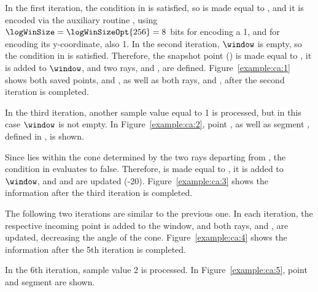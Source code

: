 In the first iteration, the condition in  is satisfied, so \archived is made equal to , and it is encoded via the auxiliary routine \CAWinStart, using $\logWinSize = \logWinSizeOpt{256}=8$ bits for encoding a 1, and \tobitexp for encoding its y-coordinate, also 1. In the second iteration, $\window$ is empty, so the condition in  is satisfied. Therefore, the snapshot point (\snapshot) is made equal to , it is added to $\window$, and two rays, \smin and \smax, are defined. Figure~\ref{example:ca:1} shows both saved points, \archived and \snapshot, as well as both rays, \smin and \smax, after the second iteration is completed.


\vspace{+3pt}


In the third iteration, another sample value equal to 1 is processed, but in this case $\window$ is not empty. In Figure~\ref{example:ca:2}, point , as well as segment , defined in , is shown.


\vspace{+3pt}


\clearpage


Since  lies within the cone determined by the two rays departing from \archived, the condition in  evaluates to false. Therefore, \snapshot is made equal to , it is added to $\window$, and \smin and \smax are updated (-20). Figure~\ref{example:ca:3} shows the information after the third iteration is completed.


\vspace{+5pt}


The following two iterations are similar to the previous one. In each iteration, the respective incoming point is added to the window, and both rays, \smin and \smax, are updated, decreasing the angle of the cone. Figure~\ref{example:ca:4} shows the information after the 5th iteration is completed.


\vspace{+5pt}


\clearpage


In the 6th iteration, sample value 2 is processed. In Figure~\ref{example:ca:5}, point  and segment  are shown.




